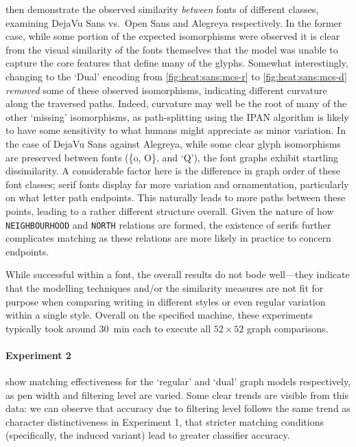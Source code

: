\documentclass{mpaper}
\begin{document}
 then demonstrate the observed similarity \emph{between} fonts of different classes, examining DejaVu Sans vs.\ Open Sans and Alegreya respectively.
In the former case, while some portion of the expected isomorphisms were observed it is clear from the visual similarity of the fonts themselves that the model was unable to capture the core features that define many of the glyphs.
Somewhat interestingly, changing to the `Dual' encoding from \cref{fig:heat:sans:mcs-r} to \cref{fig:heat:sans:mcs-d} \emph{removed} some of these observed isomorphisms, indicating different curvature along the traversed paths.
Indeed, curvature may well be the root of many of the other `missing' isomorphisms, as path-splitting using the IPAN algorithm is likely to have some sensitivity to what humans might appreciate as minor variation.
In the case of DejaVu Sans against Alegreya, while some clear glyph isomorphisms are preserved between fonts (\{o, O\}, and `Q'), the font graphs exhibit startling dissimilarity.
A considerable factor here is the difference in graph order of these font classes; serif fonts display far more variation and ornamentation, particularly on what letter path endpoints.
This naturally leads to more paths between these points, leading to a rather different structure overall.
Given the nature of how \texttt{NEIGHBOURHOOD} and \texttt{NORTH} relations are formed, the existence of serifs further complicates matching as these relations are more likely in practice to concern endpoints.

While successful within a font, the overall results do not bode well---they indicate that the modelling techniques and/or the similarity measures are not fit for purpose when comparing writing in different styles or even regular variation within a single style.
Overall on the specified machine, these experiments typically took around \SI{30}{\minute} each to execute all $52\times52$ graph comparisons.

\paragraph{Experiment 2}
 show matching effectiveness for the `regular' and `dual' graph models respectively, as pen width and filtering level are varied.
Some clear trends are visible from this data: we can observe that accuracy due to filtering level follows the same trend as character distinctiveness in Experiment 1, that stricter matching conditions (specifically, the induced variant) lead to greater classifier accuracy.
\end{document}
